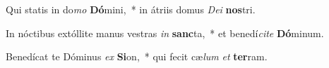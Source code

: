 \item Qui statis in do\textit{mo} \textbf{Dó}mini,~* in átriis domus \textit{De}\textit{i} \textbf{nos}tri.
\item In nóctibus extóllite manus vestras \textit{in} \textbf{sanc}ta,~* et benedí\textit{ci}\textit{te} \textbf{Dó}minum.
\item Benedícat te Dóminus \textit{ex} \textbf{Si}on,~* qui fecit cæ\textit{lum} \textit{et} \textbf{ter}ram.
